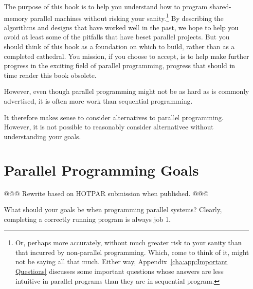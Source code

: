 The purpose of this book is to help you understand how to program
shared-memory parallel machines without risking your sanity.\footnote{
	Or, perhaps more accurately, without much greater risk to your
	sanity than that incurred by non-parallel programming.
	Which, come to think of it, might not be saying all that much.
	Either way, Appendix~\ref{cha:app:Important Questions} discusses
	some important questions whose answers are less intuitive in
	parallel programs than they are in sequential program.}
By describing the algorithms and designs that have worked well in
the past, we hope to help you avoid at least some of the pitfalls
that have beset parallel projects.
But you should think of this book as a foundation on which to build,
rather than as a completed cathedral.
You mission, if you choose to accept, is to help make further progress
in the exciting field of parallel programming, progress that should
in time render this book obsolete.

However, even though parallel programming might not be as hard as
is commonly advertised, it is often more work than sequential
programming.

 \QuickQuizEnd

It therefore makes sense to consider alternatives to parallel programming.
However, it is not possible to reasonably consider alternativee without
understanding your goals.

\section{Parallel Programming Goals}
\label{sec:intro:Parallel Programming Goals}

@@@ Rewrite based on HOTPAR submission when published. @@@

What should your goals be when programming parallel systems?
Clearly, completing a correctly running program is always job 1.

